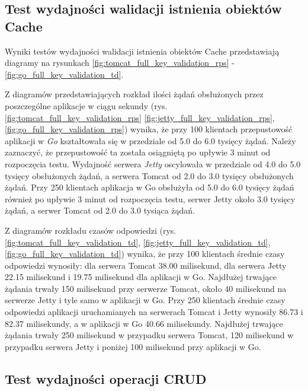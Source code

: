 % 
\clearpage

\subsection{Test wydajności walidacji istnienia obiektów Cache}
Wyniki testów wydajności walidacji istnienia obiektów Cache przedstawiają diagramy na rysunkach \ref{fig:tomcat_full_key_validation_rps} - \ref{fig:go_full_key_validation_td}.              

Z diagramów przedstawiających rozkład ilości żądań obsłużonych przez poszczególne aplikacje w ciągu sekundy  (rys. \ref{fig:tomcat_full_key_validation_rps} \ref{fig:jetty_full_key_validation_rps}, \ref{fig:go_full_key_validation_rps}) wynika, że przy 100 klientach przepustowość aplikacji w \textsl{Go} kształtowała się w przedziale od 5.0 do 6.0 tysięcy żądań. Należy zaznaczyć, że przepustowość ta została osiągniętą po upływie 3 minut od rozpoczęcia testu. Wydajność serwera \textsl{Jetty} oscylowała w przedziale od 4.0 do 5.0 tysięcy obsłużonych żądań, a serwera Tomcat od 2.0 do 3.0 tysięcy obsłużonych żądań. Przy 250 klientach aplikacja w Go obsłużyła od 5.0 do 6.0 tysięcy żądań również po upływie 3 minut od rozpoczęcia testu, serwer Jetty około 3.0 tysięcy żądań, a serwer Tomcat od 2.0 do 3.0 tysiąca żądań.

Z diagramów rozkładu czasów odpowiedzi (rys. \ref{fig:tomcat_full_key_validation_td}, \ref{fig:jetty_full_key_validation_td}, \ref{fig:go_full_key_validation_td}) wynika, że przy 100 klientach średnie czasy odpowiedzi wynosiły: dla serwera Tomcat 38.00 milisekund, dla serwera Jetty 22.15 milisekund i 19.75 milisekund dla aplikacji w Go. Najdłużej trwające żądania trwały 150 milisekund przy serwerze Tomcat, około 40 milisekund na serwerze Jetty i tyle samo w aplikacji w Go. Przy 250 klientach średnie czasy odpowiedzi aplikacji uruchamianych na serwerach Tomcat i Jetty wynosiły 86.73 i 82.37 milisekundy, a w aplikacji w Go 40.66 milisekundy. Najdłużej trwające żądania trwały 250 milisekund w przypadku serwera Tomcat, 120 milisekund w przypadku serwera Jetty i poniżej 100  milisekund przy aplikacji w Go. 

% 
\clearpage

\subsection{Test wydajności operacji CRUD}

